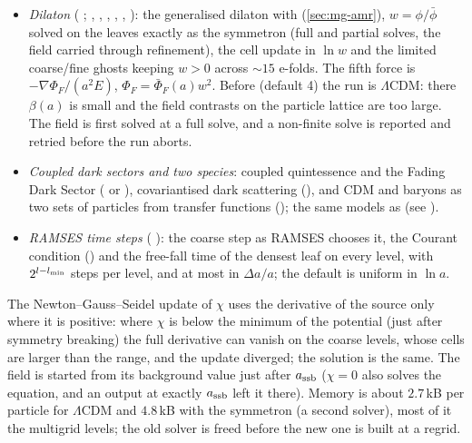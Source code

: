 \begin{itemize}
      is carried through refinement. Its fifth force $-\nabla\Phi_F/(a^2E)$, $\Phi_F\propto\chi^N$, is added to the
      force on the leaves; before symmetry breaking the run is $\Lambda$CDM.
\item \emph{Dilaton} ( ; , , ,
      , , ): the generalised dilaton \cite{Brax2012}
      with  (\cref{sec:mg-amr}), $w=\phi/\bar\phi$ solved on the leaves exactly as the symmetron
      (full and partial solves, the field carried through refinement), the cell update in $\ln w$ and the limited coarse/fine
      ghosts keeping $w>0$ across $\sim15$ e-folds. The fifth force is $-\nabla\Phi_F/(a^2E)$, $\Phi_F=\bar\Phi_F(a)w^2$. Before
       (default 4) the run is $\Lambda$CDM: there $\beta(a)$ is small and the field contrasts on the
      particle lattice are too large. The field is first solved at a full solve, and a non-finite solve is reported and retried
      before the run aborts.
\item \emph{Coupled dark sectors and two species}: coupled quintessence and the Fading Dark Sector
      (  or ), covariantised dark scattering
      (), and CDM and baryons as two sets of particles from transfer functions
      (); the same models as  (see ).
\item \emph{RAMSES time steps} ( ): the coarse step as RAMSES chooses it, the
      Courant condition () and the free-fall time of the densest leaf on every level, with
      $2^{l-l_{\rm min}}$ steps per level, and at most  in $\Delta a/a$; the default
       is uniform in $\ln a$.
\end{itemize}

\begin{implementation}
The Newton--Gauss--Seidel update of $\chi$ uses the derivative of the source only where it is positive: where $\chi$ is
below the minimum of the potential (just after symmetry breaking) the full derivative can vanish on the coarse levels,
whose cells are larger than the range, and the update diverged; the solution is the same. The field is started from its
background value just after $a_{\rm ssb}$ ($\chi=0$ also solves the equation, and an output at exactly $a_{\rm ssb}$ left it
there). Memory is about $2.7\,$kB per particle for $\Lambda$CDM and $4.8\,$kB with the symmetron (a second solver), most of
it the multigrid levels; the old solver is freed before the new one is built at a regrid.
\end{implementation}

